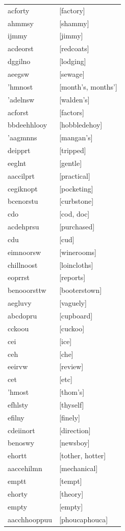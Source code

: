 \documentclass{article}
\begin{document}
\begin{tabular}{ll}
acforty & [factory] \\
ahmmsy & [shammy] \\
ijmmy & [jimmy] \\
acdeorst & [redcoats] \\
dggilno & [lodging] \\
aeegsw & [sewage] \\
'hmnost & [month's, months'] \\
'adelnsw & [walden's] \\
acforst & [factors] \\
bbdeehhlooy & [hobbledehoy] \\
'aagmnns & [mangan's] \\
deipprt & [tripped] \\
eeglnt & [gentle] \\
aaccilprt & [practical] \\
cegiknopt & [pocketing] \\
bcenorstu & [curbstone] \\
cdo & [cod, doc] \\
acdehprsu & [purchased] \\
cdu & [cud] \\
eimnoorsw & [winerooms] \\
chillnoost & [loincloths] \\
eoprrst & [reports] \\
benooorsttw & [booterstown] \\
aegluvy & [vaguely] \\
abcdopru & [cupboard] \\
cckoou & [cuckoo] \\
cei & [ice] \\
ceh & [che] \\
eeirvw & [review] \\
cet & [etc] \\
'hmost & [thom's] \\
efhlsty & [thyself] \\
efilny & [finely] \\
cdeiinort & [direction] \\
benoswy & [newsboy] \\
ehortt & [tother, hotter] \\
aaccehilmn & [mechanical] \\
emptt & [tempt] \\
ehorty & [theory] \\
empty & [empty] \\
aacchhooppuu & [phoucaphouca] \\

\end{tabular}
\end{document}
